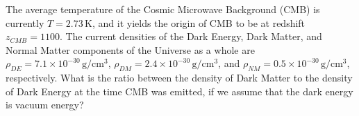 The average temperature of the Cosmic Microwave Background (CMB) is currently
$T = 2.73$\,K, and it yields the origin of CMB to be at redshift
$z_{CMB} = 1100$. The current densities of the Dark Energy, Dark Matter, and
Normal Matter components of the Universe as a whole are
$\rho_{DE} = 7.1 \times 10^{-30}\,\mathrm{g/cm^3}$,
$\rho_{DM} = 2.4 \times 10^{-30}\,\mathrm{g/cm^3}$, and
$\rho_{NM} = 0.5 \times 10^{-30}\,\mathrm{g/cm^3}$, respectively. What is the
ratio between the density of Dark Matter to the density of Dark Energy at the
time CMB was emitted, if we assume that the dark energy is vacuum energy?
